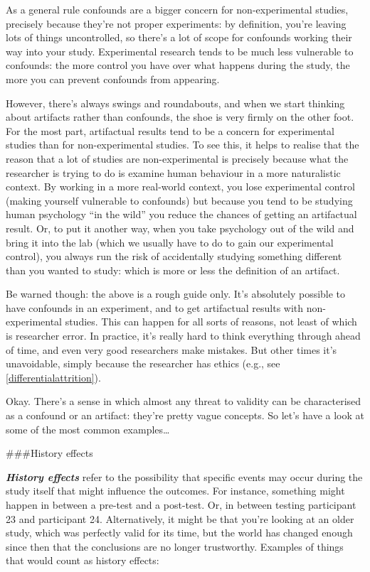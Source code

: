 \documentclass[]{book}
\begin{document}
As a general rule confounds are a bigger concern for non-experimental studies, precisely because they're not proper experiments: by definition, you're leaving lots of things uncontrolled, so there's a lot of scope for confounds working their way into your study. Experimental research tends to be much less vulnerable to confounds: the more control you have over what happens during the study, the more you can prevent confounds from appearing.

However, there's always swings and roundabouts, and when we start thinking about artifacts rather than confounds, the shoe is very firmly on the other foot. For the most part, artifactual results tend to be a concern for experimental studies than for non-experimental studies. To see this, it helps to realise that the reason that a lot of studies are non-experimental is precisely because what the researcher is trying to do is examine human behaviour in a more naturalistic context. By working in a more real-world context, you lose experimental control (making yourself vulnerable to confounds) but because you tend to be studying human psychology ``in the wild'' you reduce the chances of getting an artifactual result. Or, to put it another way, when you take psychology out of the wild and bring it into the lab (which we usually have to do to gain our experimental control), you always run the risk of accidentally studying something different than you wanted to study: which is more or less the definition of an artifact.

Be warned though: the above is a rough guide only. It's absolutely possible to have confounds in an experiment, and to get artifactual results with non-experimental studies. This can happen for all sorts of reasons, not least of which is researcher error. In practice, it's really hard to think everything through ahead of time, and even very good researchers make mistakes. But other times it's unavoidable, simply because the researcher has ethics (e.g., see \ref{differentialattrition}).

Okay. There's a sense in which almost any threat to validity can be characterised as a confound or an artifact: they're pretty vague concepts. So let's have a look at some of the most common examples\ldots{}

\#\#\#History effects

\textbf{\emph{History effects}} refer to the possibility that specific events may occur during the study itself that might influence the outcomes. For instance, something might happen in between a pre-test and a post-test. Or, in between testing participant 23 and participant 24. Alternatively, it might be that you're looking at an older study, which was perfectly valid for its time, but the world has changed enough since then that the conclusions are no longer trustworthy. Examples of things that would count as history effects:
\end{document}
